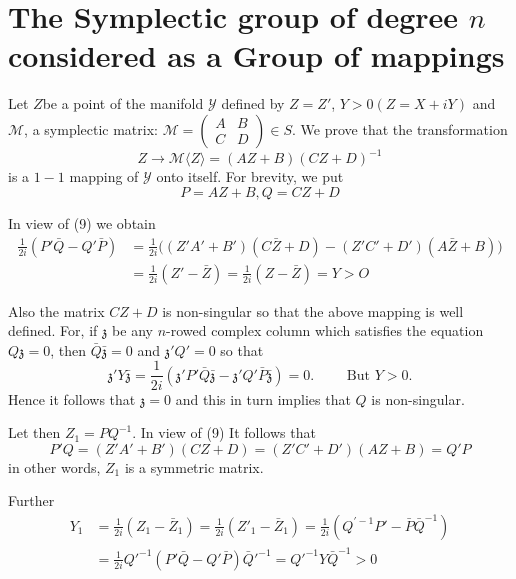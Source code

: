 \chapter[The Symplectic group of degree \texorpdfstring{$n$}{n} ....]{The Symplectic group of degree \texorpdfstring{$n$}{n} considered as a Group of
  mappings}%

Let $Z$\pageoriginale be a point of the manifold $\mathscr{Y}$ defined
by $Z = Z'$, $Y > 0   (Z = X + iY)$ and $\mathcal{M}$, a symplectic
matrix: $\mathcal{M} = \begin{pmatrix}A & B \\ C & D \end{pmatrix} \in
S$. We prove that the transformation  
\begin{equation*}
Z \rightarrow \mathcal{M} \langle Z \rangle = (AZ + B) (CZ + D)^{-1}
\tag{23}\label{eq23} 
\end{equation*}
is a $1 -1$ mapping of $\mathscr{Y}$ onto itself. For brevity, we put
$$
P = AZ + B,   Q = CZ + D
$$

In view of (9) we obtain
\begin{align*}
\frac{1}{2i} (P'\bar{Q} - Q'\bar{P}) & = \frac{1}{2i}\big( (Z'A' + B')
(C\bar{Z} + D) - (Z'C' + D') (A\bar{Z} + B)\big) \\ 
& = \frac{1}{2i} (Z' - \bar{Z}) = \frac{1}{2i} (Z - \bar{Z}) = Y > O
\end{align*}

Also the matrix $CZ + D$ is non-singular so that the above mapping is
well defined. For, if $\mathfrak{z}$ be any $n$-rowed complex column
which satisfies the equation $Q   \mathfrak{z} = 0$, then $\bar{Q}
\bar{\mathfrak{z}} = 0$ and $\mathfrak{z}'   Q' = 0$ so that  
$$
\mathfrak{z}'   Y   \bar{\mathfrak{z}} = \frac{1}{2i} (\mathfrak{z}'
P'   \bar{Q}   \bar{\mathfrak{z}} - \mathfrak{z}'   Q' \bar{P}
\bar{\mathfrak{z}}) = 0. \qquad \text{ But } Y > 0. 
$$
Hence it follows that $\mathfrak{z} = 0$ and this in turn implies that
$Q$ is non-singular. 

Let then $Z_1 = PQ^{-1}$. In view of (9) It follows that 
$$
P'Q = (Z'A' + B') (CZ + D) = (Z'C' + D')(AZ + B) = Q'P
$$
in other words, $Z_1$ is a symmetric matrix.

Further 
\begin{align*}
Y_1 & = \frac{1}{2i} (Z_1 - \bar{Z}_1) = \frac{1}{2i} (Z'_1 -
\bar{Z}_1) = \frac{1}{2i}(Q^{'-1} P' - \bar{P}\bar{Q}^{-1})\\ 
& = \frac{1}{2i} Q'^{-1}(P'\bar{Q} - Q'\bar{P})\bar{Q}'^{-1} = Q'^{-1}
Y \bar{Q}^{-1} > 0 \tag{24}\label{eq24}  
\end{align*}

